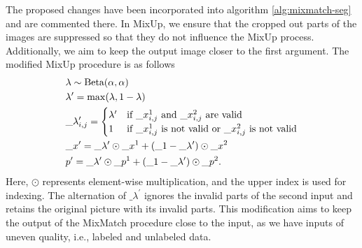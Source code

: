 The proposed changes have been incorporated into algorithm \ref{alg:mixmatch-seg} and are commented there. In MixUp, we 
ensure that the cropped out parts of the images are suppressed so that they do not influence the MixUp process. 
Additionally, we aim to keep the output image closer to the first argument. The modified MixUp procedure is as follows
\begin{align}
  &\lambda \sim \text{Beta}(\alpha,\alpha) \notag\\
  &\lambda^\prime = \max(\lambda,1-\lambda) \notag\\
  &\_\lambda^\prime_{i,j} =\begin{cases}
    \lambda^\prime & \text{if } \_x^{1}_{i,j} \text{ and }  \_x^{2}_{i,j} \text{ are valid}\\
    1 & \text{if }  \_x^{1}_{i,j} \text{ is not valid or }  \_x^{2}_{i,j} \text{ is not valid}\\
  \end{cases} \label{eq:mixup_alternated}\\
  &\_x^\prime = \_\lambda^\prime \odot \_x^1 + (\_1-\_\lambda^\prime) \odot \_x^2 \notag\\
  &p^\prime = \_\lambda^\prime \odot \_p^1 + (\_1-\_\lambda^\prime) \odot \_p^2. \notag
\end{align}
Here, $\odot$ represents element-wise multiplication, and the upper index is used for indexing. The alternation
 of $\_{\lambda}^\prime$ ignores the invalid parts of the second input and retains the original picture 
 with its invalid parts. This modification aims to keep the output of the MixMatch procedure close to the input, as 
 we have inputs of uneven quality, i.e., labeled and unlabeled data.

